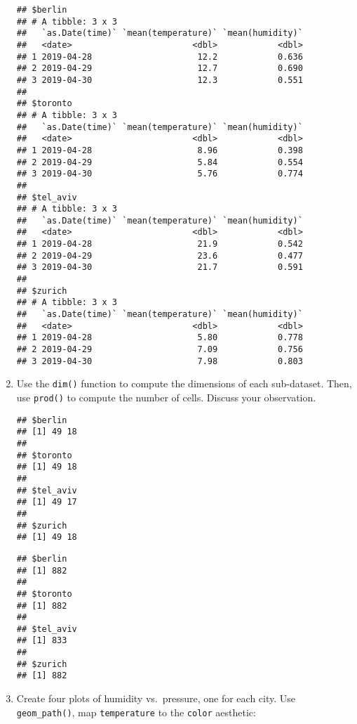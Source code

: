 \documentclass[]{book}
\newenvironment{Shaded}{\begin{snugshade}}{\end{snugshade}}
\newcommand{\NormalTok}[1]{#1}
\newcommand{\OperatorTok}[1]{\textcolor[rgb]{0.81,0.36,0.00}{\textbf{#1}}}
\newcommand{\StringTok}[1]{\textcolor[rgb]{0.31,0.60,0.02}{#1}}
\begin{document}
\begin{enumerate}
\begin{verbatim}
## $berlin
## # A tibble: 3 x 3
##   `as.Date(time)` `mean(temperature)` `mean(humidity)`
##   <date>                        <dbl>            <dbl>
## 1 2019-04-28                     12.2            0.636
## 2 2019-04-29                     12.7            0.690
## 3 2019-04-30                     12.3            0.551
## 
## $toronto
## # A tibble: 3 x 3
##   `as.Date(time)` `mean(temperature)` `mean(humidity)`
##   <date>                        <dbl>            <dbl>
## 1 2019-04-28                     8.96            0.398
## 2 2019-04-29                     5.84            0.554
## 3 2019-04-30                     5.76            0.774
## 
## $tel_aviv
## # A tibble: 3 x 3
##   `as.Date(time)` `mean(temperature)` `mean(humidity)`
##   <date>                        <dbl>            <dbl>
## 1 2019-04-28                     21.9            0.542
## 2 2019-04-29                     23.6            0.477
## 3 2019-04-30                     21.7            0.591
## 
## $zurich
## # A tibble: 3 x 3
##   `as.Date(time)` `mean(temperature)` `mean(humidity)`
##   <date>                        <dbl>            <dbl>
## 1 2019-04-28                     5.80            0.778
## 2 2019-04-29                     7.09            0.756
## 3 2019-04-30                     7.98            0.803
\end{verbatim}
\item
  Use the \texttt{dim()} function to compute the dimensions of each sub-dataset. Then, use \texttt{prod()} to compute the number of cells. Discuss your observation.

\begin{Shaded}
\end{Shaded}

\begin{verbatim}
## $berlin
## [1] 49 18
## 
## $toronto
## [1] 49 18
## 
## $tel_aviv
## [1] 49 17
## 
## $zurich
## [1] 49 18
\end{verbatim}

\begin{verbatim}
## $berlin
## [1] 882
## 
## $toronto
## [1] 882
## 
## $tel_aviv
## [1] 833
## 
## $zurich
## [1] 882
\end{verbatim}
\item
  Create four plots of humidity vs.~pressure, one for each city. Use \texttt{geom\_path()}, map \texttt{temperature} to the \texttt{color} aesthetic:


\end{enumerate}
\end{document}
